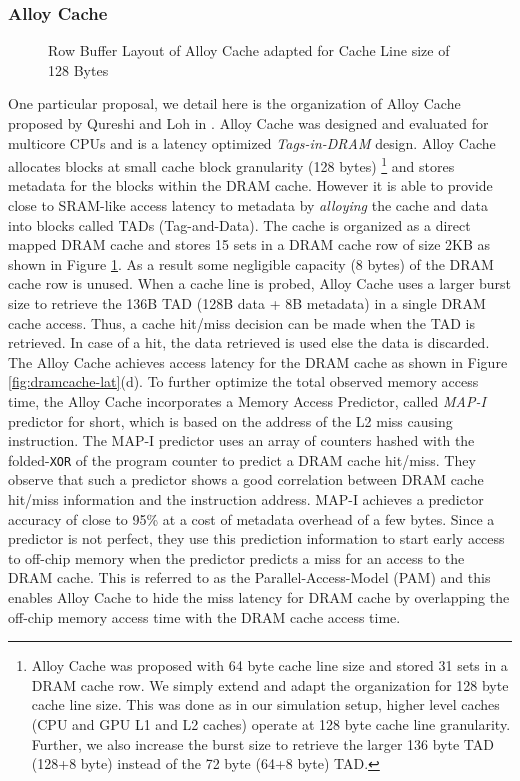 \subsubsection{Alloy Cache} \label{alloy-background}
\begin{figure}[!htb]
	\centering
	\def\svgwidth{\columnwidth}
	
	\caption{Row Buffer Layout of Alloy Cache adapted for Cache Line size of 128 Bytes}
	\label{fig:dramcache-rb}
\end{figure}
\par One particular proposal, we detail here is the organization of Alloy Cache proposed by Qureshi and Loh in \cite{alloy}. Alloy Cache was designed and evaluated for multicore CPUs and is a latency optimized \textit{Tags-in-DRAM} design. Alloy Cache allocates blocks at small cache block granularity (128 bytes)
\footnote{Alloy Cache was proposed with 64 byte cache line size and stored 31 sets in a DRAM cache row. We simply extend and adapt the organization for 128 byte cache line size. This was done as in our simulation setup, higher level caches (CPU and GPU L1 and L2 caches) operate at 128 byte cache line granularity. Further, we also increase the burst size to retrieve the larger 136 byte TAD (128+8 byte) instead of the 72 byte (64+8 byte) TAD.} 
and stores metadata for the blocks within the DRAM cache. However it is able to provide close to SRAM-like access latency to metadata by \textit{alloying} the cache and data into blocks called TADs (Tag-and-Data). The cache is organized as a direct mapped DRAM cache and stores 15 sets in a DRAM cache row of size 2KB as shown in Figure \ref{fig:dramcache-rb}. As a result some negligible capacity (8 bytes) of the DRAM cache row is unused. When a cache line is probed, Alloy Cache uses a larger burst size to retrieve the 136B TAD (128B data + 8B metadata) in a single DRAM cache access. Thus, a cache hit/miss decision can be made when the TAD is retrieved. In case of a hit, the data retrieved is used else the data is discarded. The Alloy Cache achieves access latency for the DRAM cache as shown in Figure \ref{fig:dramcache-lat}(d). To further optimize the total observed memory access time, the Alloy Cache incorporates a Memory Access Predictor, called \textit{MAP-I} predictor \cite{alloy} for short, which is based on the address of the L2 miss causing instruction. The MAP-I predictor uses an array of counters hashed with the folded-{\tt XOR} of the program counter to predict a DRAM cache hit/miss. They observe that such a predictor shows a good correlation between DRAM cache hit/miss information and the instruction address. MAP-I achieves a predictor accuracy of close to 95\% at a cost of metadata overhead of a few bytes. Since a predictor is not perfect, they use this prediction information to start early access to off-chip memory when the predictor predicts a miss for an access to the DRAM cache. This is referred to as the Parallel-Access-Model (PAM) and this enables Alloy Cache to hide the miss latency for DRAM cache by overlapping the off-chip memory access time with the DRAM cache access time.


